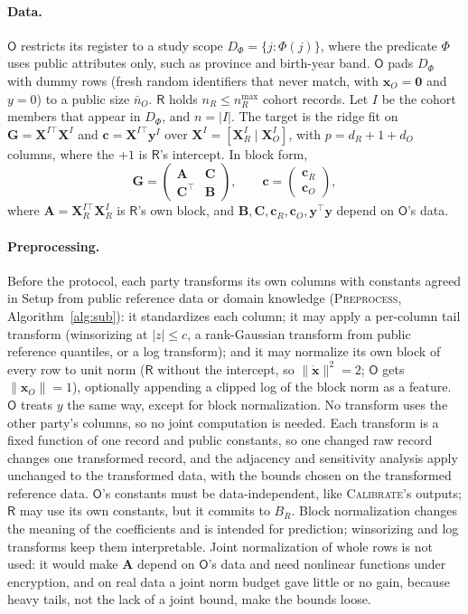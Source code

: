 \documentclass[11pt]{article}
\theoremstyle{definition}
\theoremstyle{plain}
\newcommand{\Rp}{\mathsf{R}}
\newcommand{\Op}{\mathsf{O}}
\newcommand{\bX}{\mathbf{X}}
\newcommand{\bA}{\mathbf{A}}
\newcommand{\bB}{\mathbf{B}}
\newcommand{\bC}{\mathbf{C}}
\newcommand{\bG}{\mathbf{G}}
\newcommand{\bc}{\mathbf{c}}
\newcommand{\by}{\mathbf{y}}
\newcommand{\bx}{\mathbf{x}}
\newcommand{\bxd}{\dot{\mathbf{x}}}
\begin{document}
\paragraph{Data.} $\Op$ restricts its register to a study scope $D_\Phi=\{j:\Phi(j)\}$, where the predicate $\Phi$ uses public attributes only, such as province and birth-year band. $\Op$ pads $D_\Phi$ with dummy rows (fresh random identifiers that never match, with $\bx_O=\mathbf{0}$ and $y=0$) to a public size $\bar n_O$. $\Rp$ holds $n_R\le n_R^{\max}$ cohort records. Let $I$ be the cohort members that appear in $D_\Phi$, and $n=|I|$. The target is the ridge fit on $\bG=\bX^{I\top}\bX^{I}$ and $\bc=\bX^{I\top}\by^I$ over $\bX^I=[\bX_R^I\mid\bX_O^I]$, with $p=d_R+1+d_O$ columns, where the $+1$ is $\Rp$'s intercept. In block form,
\[
  \bG=\begin{pmatrix}\bA & \bC\\ \bC^\top & \bB\end{pmatrix},\qquad
  \bc=\begin{pmatrix}\bc_R\\ \bc_O\end{pmatrix},
\]
where $\bA=\bX_R^{I\top}\bX_R^{I}$ is $\Rp$'s own block, and $\bB,\bC,\bc_R,\bc_O,\by^\top\by$ depend on $\Op$'s data.

\paragraph{Preprocessing.} Before the protocol, each party transforms its own columns with constants agreed in Setup from public reference data or domain knowledge (\textsc{Preprocess}, Algorithm~\ref{alg:sub}): it standardizes each column; it may apply a per-column tail transform (winsorizing at $|z|\le c$, a rank-Gaussian transform from public reference quantiles, or a log transform); and it may normalize its own block of every row to unit norm ($\Rp$ without the intercept, so $\|\bxd\|^2=2$; $\Op$ gets $\|\bx_O\|=1$), optionally appending a clipped log of the block norm as a feature. $\Op$ treats $y$ the same way, except for block normalization. No transform uses the other party's columns, so no joint computation is needed. Each transform is a fixed function of one record and public constants, so one changed raw record changes one transformed record, and the adjacency and sensitivity analysis apply unchanged to the transformed data, with the bounds chosen on the transformed reference data. $\Op$'s constants must be data-independent, like \textsc{Calibrate}'s outputs; $\Rp$ may use its own constants, but it commits to $B_R$. Block normalization changes the meaning of the coefficients and is intended for prediction; winsorizing and log transforms keep them interpretable. Joint normalization of whole rows is not used: it would make $\bA$ depend on $\Op$'s data and need nonlinear functions under encryption, and on real data a joint norm budget gave little or no gain, because heavy tails, not the lack of a joint bound, make the bounds loose.
\end{document}
